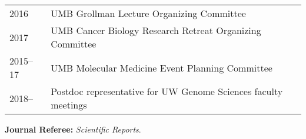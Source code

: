\documentclass{article}
\newcommand{\mysection}[1]{\vspace{1ex}{\bf #1}}
\begin{document}
\mysection{Professional Service}

\begin{tabular}{p{0.5in}p{5.75in}}
  2016       & UMB Grollman Lecture Organizing Committee \\
  2017       & UMB Cancer Biology Research Retreat Organizing Committee \\
  2015--17 & UMB Molecular Medicine Event Planning Committee \\
  2018--     & Postdoc representative for UW Genome Sciences faculty meetings\\ 
\end{tabular}

{\bf Journal Referee: }{\em Scientific Reports}.
\end{document}
